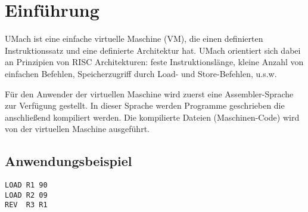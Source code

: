 \chapter{Einführung}
UMach ist eine einfache virtuelle Maschine (VM), die einen definierten Instruktionssatz
und eine definierte Architektur hat. UMach orientiert sich dabei an Prinzipien
von RISC Architekturen: feste Instruktionslänge,
kleine Anzahl von einfachen Befehlen, Speicherzugriff durch Load- und
Store-Befehlen, u.s.w.


Für den Anwender der virtuellen Maschine wird zuerst eine Assembler-Sprache zur
Verfügung gestellt. In dieser Sprache werden Programme geschrieben die
anschließend kompiliert werden. Die kompilierte Dateien (Maschinen-Code) wird
von der virtuellen Maschine ausgeführt.

\section{Anwendungsbeispiel}



\begin{lstlisting}
LOAD R1 90
LOAD R2 09
REV  R3 R1
\end{lstlisting}



